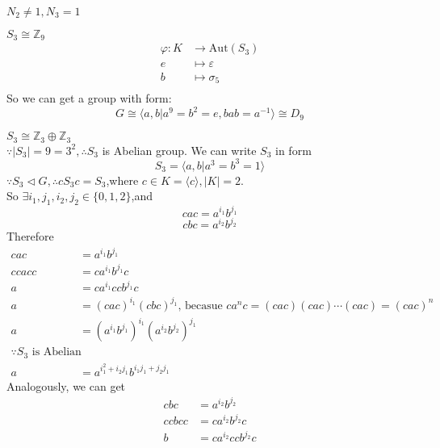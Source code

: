 \documentclass[a4paper,14pt]{article}
\begin{document}
\begin{enumerate}
\begin{item}{$N_2 \neq 1, N_3 = 1$}
\begin{enumerate}
\begin{item}{$S_3 \cong \mathbb{Z}_9$}
                    \begin{align*}
                        \varphi:K &\rightarrow \text{Aut}(S_3)\\
                        e &\longmapsto \varepsilon\\
                        b &\longmapsto \sigma_5 \\
                    \end{align*}
                    So we can get a group with form:
                    \[
                        G\cong \langle a,b|a^9=b^2=e,bab=a^{-1} \rangle \cong D_9
                        \]
                \end{item}

                \begin{item}{$S_3\cong \mathbb{Z}_3 \oplus \mathbb{Z}_3$}\\
                    $\because|S_3|=9=3^2,\therefore S_3$ is Abelian group. We can write $S_3$ in form
                    \[
                        S_3=\langle a,b|a^3=b^3=1\rangle
                        \]
                    $\because S_3 \lhd G,\therefore cS_3c=S_3$,where $c \in K=\langle c \rangle,|K|=2$.\\
                    So $\exists i_1,j_1,i_2,j_2 \in \{0,1,2\}$,and 
                    \[ cac=a^{i_1}b^{j_1}\]
                    \[ cbc=a^{i_2}b^{j_2}\]
                    Therefore
                    \begin{align*}
                        cac &= a^{i_1}b^{j_1}\\
                        ccacc &= ca^{i_1}b^{j_1}c\\
                        a &= ca^{i_1}ccb^{j_1}c\\
                        a &= (cac)^{i_1}(cbc)^{j_1}\text{, becasue } ca^nc=(cac)(cac)\cdots(cac)=(cac)^n\\
                        a &= (a^{i_1}b^{j_1})^{i_1}(a^{i_2}b^{j_2})^{j_1}\\
                        \because S_3 \text{ is Abelian group, so}\\
                        a &= a^{i_1^2+i_2j_1}b^{i_1j_1+j_2j_1}
                    \end{align*}
                    Analogously, we can get
                    \begin{align*}
                        cbc &= a^{i_2}b^{j_2}\\
                        ccbcc &= ca^{i_2}b^{j_2}c\\
                        b &= ca^{i_2}ccb^{j_2}c\\

\end{align*}
\end{item}
\end{enumerate}
\end{item}
\end{enumerate}
\end{document}
